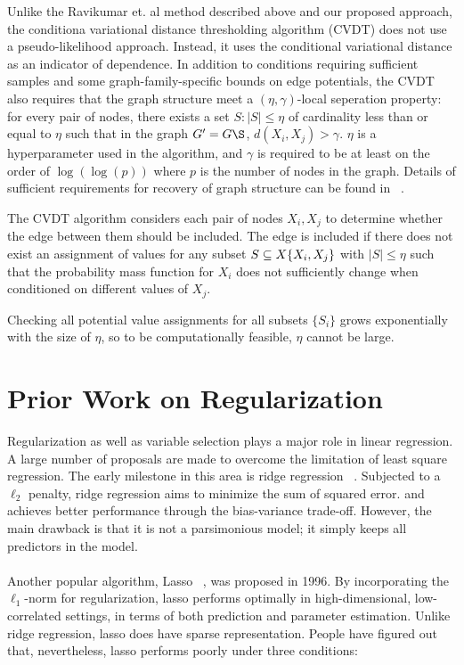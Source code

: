\documentclass[11pt]{article}
\begin{document}
Unlike the Ravikumar et. al method described above and our proposed approach, the conditiona variational distance thresholding algorithm (CVDT) \cite{anandkumar2012high} does not use a pseudo-likelihood approach.  Instead, it uses the conditional variational distance as an indicator of dependence. In addition to conditions requiring sufficient samples and some graph-family-specific bounds on edge potentials, the CVDT also requires that the graph structure meet a $(\eta,\gamma)$-local seperation property: for every pair of nodes, there exists a set $S: |S| \leq \eta$ of cardinality less than or equal to $\eta$ such that in the graph $G' = G\S$, $d(X_i,X_j) > \gamma$. $\eta$ is a hyperparameter used in the algorithm, and $\gamma$ is required to be at least on the order of $\log(\log(p))$ where $p$ is the number of nodes in the graph. Details of sufficient requirements for recovery of graph structure can be found in ~\cite{anandkumar2012high}.

The CVDT algorithm considers each pair of nodes $X_i,X_j$ to determine whether the edge between them should be included.  The edge is included if there does not exist an assignment of values for any subset $S \subseteq X\\\{X_i,X_j\}$ with $|S| \leq \eta$ such that the probability mass function for $X_i$ does not sufficiently change when conditioned on different values of $X_j$.


Checking all potential value assignments for all subsets $\{S_i\}$ grows exponentially with the size of $\eta$, so to be computationally feasible, $\eta$ cannot be large. 




\section{Prior Work on Regularization}

Regularization as well as variable selection plays a major role in linear regression. A large number of proposals are made to overcome the limitation of least square regression. The early milestone in this area is ridge regression ~\cite{AEHoerl1970ridge}. Subjected to a $\ell_2$ penalty, ridge regression aims to minimize the sum of squared error. and achieves better performance through the bias-variance trade-off. However, the main drawback is that it is not a parsimonious model; it simply keeps all predictors in the model. 
\\ \\
Another popular algorithm, Lasso ~\cite{tibshirani1996regression}, was proposed in 1996. By incorporating the $\ell_1$-norm for regularization, lasso performs optimally in high-dimensional, low-correlated settings, in terms of both prediction and parameter estimation. Unlike ridge regression, lasso does have sparse representation. People have figured out that, nevertheless, lasso performs poorly under three conditions:
\end{document}

